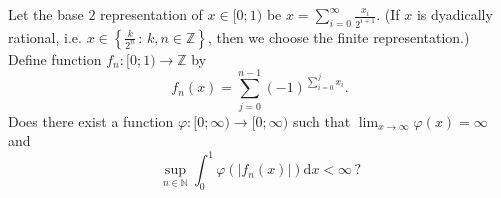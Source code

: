 Let the base $2$ representation of $x\in[0;1)$ be $x=\sum_{i=0}^\infty \frac{x_i}{2^{i+1}}$. (If $x$ is dyadically rational, i.e. $x\in\left\{\frac{k}{2^n}\,:\, k,n\in\mathbb{Z}\right\}$, then we choose the finite representation.) Define function $f_n:[0;1)\to\mathbb{Z}$ by
$$f_n(x)=\sum_{j=0}^{n-1}(-1)^{\sum_{i=0}^j x_i}.$$Does there exist a function $\varphi:[0;\infty)\to[0;\infty)$ such that $\lim_{x\to\infty} \varphi(x)=\infty$ and
$$\sup_{n\in\mathbb{N}}\int_0^1 \varphi(|f_n(x)|)\mathrm{d}x<\infty\, ?$$